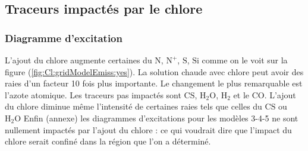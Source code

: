 \subsubsection{}

\subsection{Traceurs impactés par le chlore}
\subsubsection{Diagramme d'excitation}

L'ajout du chlore augmente certaines du $\mathrm{N}$, $\mathrm{N}^+$, $\mathrm{S}$, $\mathrm{Si}$ comme on le voit sur la figure (\autoref{fig:Cl:gridModelEmiss:yes}). La solution chaude avec chlore peut avoir des raies d'un facteur 10 fois plus importante. Le changement le plus remarquable est l'azote atomique. Les traceurs pas impactés sont $\mathrm{CS}$, $\mathrm{H}_2\mathrm{O}$, $\mathrm{H}_2$ et le $\mathrm{CO}$. L'ajout du chlore diminue même l'intensité de certaines raies tels que celles du $\mathrm{CS}$ ou $\mathrm{H}_2\mathrm{O}$ Enfin (annexe) les diagrammes d'excitations pour les modèles 3-4-5 ne sont nullement impactés par l'ajout du chlore : ce qui voudrait dire que l'impact du chlore serait confiné dans la région que l'on a déterminé.

